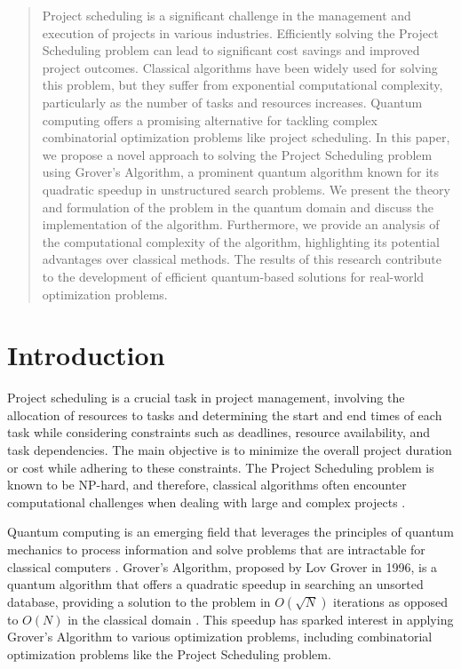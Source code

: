 \begin{abstract}

Project scheduling is a significant challenge in the management and execution of projects in various industries. Efficiently solving the Project Scheduling problem can lead to significant cost savings and improved project outcomes. Classical algorithms have been widely used for solving this problem, but they suffer from exponential computational complexity, particularly as the number of tasks and resources increases. Quantum computing offers a promising alternative for tackling complex combinatorial optimization problems like project scheduling. In this paper, we propose a novel approach to solving the Project Scheduling problem using Grover's Algorithm, a prominent quantum algorithm known for its quadratic speedup in unstructured search problems. We present the theory and formulation of the problem in the quantum domain and discuss the implementation of the algorithm. Furthermore, we provide an analysis of the computational complexity of the algorithm, highlighting its potential advantages over classical methods. The results of this research contribute to the development of efficient quantum-based solutions for real-world optimization problems.

\end{abstract}

\section{Introduction}

Project scheduling is a crucial task in project management, involving the allocation of resources to tasks and determining the start and end times of each task while considering constraints such as deadlines, resource availability, and task dependencies. The main objective is to minimize the overall project duration or cost while adhering to these constraints. The Project Scheduling problem is known to be NP-hard, and therefore, classical algorithms often encounter computational challenges when dealing with large and complex projects \cite{blazewicz1993scheduling}.

Quantum computing is an emerging field that leverages the principles of quantum mechanics to process information and solve problems that are intractable for classical computers \cite{nielsen2002quantum}. Grover's Algorithm, proposed by Lov Grover in 1996, is a quantum algorithm that offers a quadratic speedup in searching an unsorted database, providing a solution to the problem in $O(\sqrt{N})$ iterations as opposed to $O(N)$ in the classical domain \cite{grover1996fast}. This speedup has sparked interest in applying Grover's Algorithm to various optimization problems, including combinatorial optimization problems like the Project Scheduling problem.

